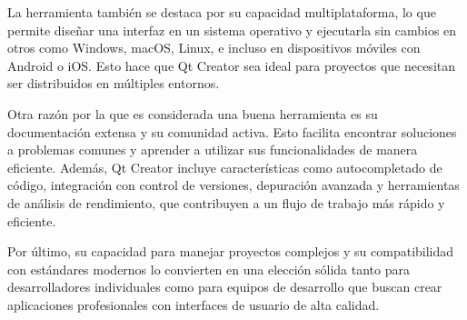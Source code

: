 \documentclass[12pt]{article}
\begin{document}
\begin{flushleft}
        \noindent\hspace*{4em}La herramienta también se destaca por su capacidad multiplataforma, lo que permite diseñar una interfaz en un sistema operativo y ejecutarla sin cambios en otros como Windows, macOS, Linux, e incluso en dispositivos móviles con Android o iOS. Esto hace que Qt Creator sea ideal para proyectos que necesitan ser distribuidos en múltiples entornos.

        \noindent\hspace*{4em}Otra razón por la que es considerada una buena herramienta es su documentación extensa y su comunidad activa. Esto facilita encontrar soluciones a problemas comunes y aprender a utilizar sus funcionalidades de manera eficiente. Además, Qt Creator incluye características como autocompletado de código, integración con control de versiones, depuración avanzada y herramientas de análisis de rendimiento, que contribuyen a un flujo de trabajo más rápido y eficiente.

        \noindent\hspace*{4em}Por último, su capacidad para manejar proyectos complejos y su compatibilidad con estándares modernos lo convierten en una elección sólida tanto para desarrolladores individuales como para equipos de desarrollo que buscan crear aplicaciones profesionales con interfaces de usuario de alta calidad.
    
    \end{flushleft}
    
\end{document}
